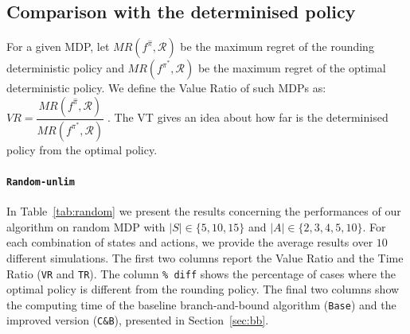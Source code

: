 \subsection{Comparison with the determinised policy}

For a given MDP, let $MR(f^{\hat{\pi}}, \mathcal{R})$ be the maximum regret of the rounding deterministic policy and $MR(f^{\pi^*}, \mathcal{R})$  be the maximum regret of the optimal deterministic policy. We define the Value Ratio of such MDPs as: $VR = \dfrac{MR(f^{\hat{\pi}}, \mathcal{R})}{MR(f^{\pi^*}, \mathcal{R})}\;$.
The VT gives an idea about how far is the determinised policy from the optimal policy. 
%
  
  
  

\paragraph{\texttt{Random-unlim}}
In Table~\ref{tab:random} we present the results concerning the performances of our algorithm on random MDP with $|S| \in \{5,10,15\}$ and $|A| \in \{2, 3, 4, 5, 10\}$. For each combination of states and actions, we provide the average results over $10$ different simulations. The first two columns report the Value Ratio and the Time Ratio (\texttt{VR} and \texttt{TR}). The column \texttt{\% diff} shows the percentage of cases where the optimal policy is different from the rounding policy. The final two columns show the computing time of the baseline branch-and-bound algorithm (\texttt{Base}) and the improved version (\texttt{C\&B}), presented in Section~\ref{sec:bb}.

